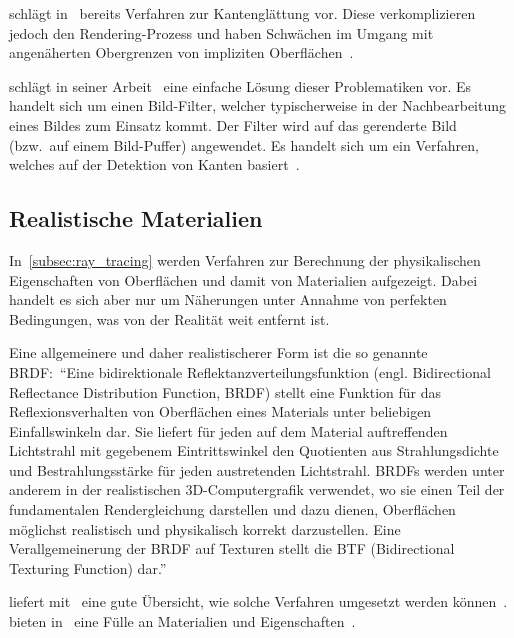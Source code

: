 \citeauthor{hart_sphere_1994} schlägt in~
bereits Verfahren zur Kantenglättung vor. Diese verkomplizieren jedoch
den Rendering-Prozess und haben Schwächen im Umgang mit angenäherten
Obergrenzen von impliziten Oberflächen~\parencite{hart_sphere_1994}.

\citeauthor{lottes_fxaa_2009} schlägt in seiner
Arbeit~ eine einfache Lösung dieser
Problematiken vor. Es handelt sich um einen Bild-Filter, welcher
typischerweise in der Nachbearbeitung eines Bildes zum Einsatz kommt.
Der Filter wird auf das gerenderte Bild (bzw.\ auf einem Bild-Puffer)
angewendet. Es handelt sich um ein Verfahren, welches auf der
Detektion von Kanten basiert~\parencite{lottes_fxaa_2009}.

\subsection{Realistische Materialien}
\label{subsec:further_work:brdf}

In~\autoref{subsec:ray_tracing} werden Verfahren zur Berechnung der
physikalischen Eigenschaften von Oberflächen und damit von Materialien
aufgezeigt. Dabei handelt es sich aber nur um Näherungen unter Annahme
von perfekten Bedingungen, was von der Realität weit entfernt ist.

Eine allgemeinere und daher realistischerer Form ist die so genannte
BRDF:\ ``Eine bidirektionale Reflektanzverteilungsfunktion (engl.
Bidirectional Reflectance Distribution Function, BRDF) stellt eine
Funktion für das Reflexionsverhalten von Oberflächen eines Materials
unter beliebigen Einfallswinkeln dar. Sie liefert für jeden auf dem
Material auftreffenden Lichtstrahl mit gegebenem Eintrittswinkel den
Quotienten aus Strahlungsdichte und Bestrahlungsstärke für jeden
austretenden Lichtstrahl. BRDFs werden unter anderem in der
realistischen 3D-Computergrafik verwendet, wo sie einen Teil der
fundamentalen Rendergleichung darstellen und dazu dienen, Oberflächen
möglichst realistisch und physikalisch korrekt darzustellen. Eine
Verallgemeinerung der BRDF auf Texturen stellt die BTF (Bidirectional
Texturing Function)
dar.''~\parencite{wikipedia_the_free_encyclopedia_bidirektionale_2014}

\citeauthor{burley_physicall-based_2012} liefert
mit~ eine gute Übersicht,
wie solche Verfahren umgesetzt werden
können~\parencite{burley_physicall-based_2012}.
\citeauthor{bagher_accurate_2012} bieten
in~ eine Fülle an Materialien und
Eigenschaften~\parencite{bagher_accurate_2012}.

